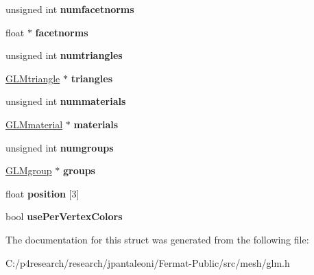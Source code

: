 \begin{DoxyCompactItemize}
unsigned int {\bfseries numfacetnorms}
\item 
\mbox{\label{struct_g_l_mmodel_a850f00c32816d53a0103da4cd583b664}} 
float $\ast$ {\bfseries facetnorms}
\item 
\mbox{\label{struct_g_l_mmodel_a003b1cf8d4e5a336e7f810bd60c1e09b}} 
unsigned int {\bfseries numtriangles}
\item 
\mbox{\label{struct_g_l_mmodel_a863d622c5f556fc37b8d3e0a6a4a4a24}} 
\hyperlink{struct_g_l_mtriangle}{G\+L\+Mtriangle} $\ast$ {\bfseries triangles}
\item 
\mbox{\label{struct_g_l_mmodel_acebd9ca8ae04727f86a1df53659923e8}} 
unsigned int {\bfseries nummaterials}
\item 
\mbox{\label{struct_g_l_mmodel_a117877dd728f71c2aa3277d0b231deec}} 
\hyperlink{struct___g_l_mmaterial}{G\+L\+Mmaterial} $\ast$ {\bfseries materials}
\item 
\mbox{\label{struct_g_l_mmodel_a175747f67b225f2b51b81be006187106}} 
unsigned int {\bfseries numgroups}
\item 
\mbox{\label{struct_g_l_mmodel_aa89060ce51dc4491ab2091373f19ddb5}} 
\hyperlink{struct___g_l_mgroup}{G\+L\+Mgroup} $\ast$ {\bfseries groups}
\item 
\mbox{\label{struct_g_l_mmodel_a71b27dfb02d701edabaa41696415046a}} 
float {\bfseries position} \mbox{[}3\mbox{]}
\item 
\mbox{\label{struct_g_l_mmodel_a9d0ef1dee591a2573871d40f833ccfee}} 
bool {\bfseries use\+Per\+Vertex\+Colors}
\end{DoxyCompactItemize}


The documentation for this struct was generated from the following file\+:\begin{DoxyCompactItemize}
\item 
C\+:/p4research/research/jpantaleoni/\+Fermat-\/\+Public/src/mesh/glm.\+h\end{DoxyCompactItemize}
